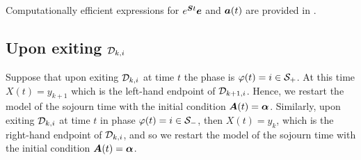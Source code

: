 Computationally efficient expressions for \(e^{\boldsymbol{S}t}\boldsymbol e\) and \(\boldsymbol a(t)\) are provided in \citep{hht2020}. 

\subsection{Upon exiting \(\mathcal{D}_{k,i}\)} Suppose that upon exiting \(\mathcal{D}_{k,i}\) at time \(t\) the phase is \(\varphi(t)=i\in\mathcal{S}_+\). At this time \(X(t)=y_{k+1}\) which is the left-hand endpoint of \(\mathcal{D}_{k+1,i}\). Hence, we restart the model of the sojourn time with the initial condition \(\boldsymbol A(t)=\boldsymbol \alpha\). Similarly, upon exiting \(\mathcal{D}_{k,i}\) at time \(t\) in phase \(\varphi(t)=i\in\mathcal{S}_-\), then \(X(t)=y_k\), which is the right-hand endpoint of \(\mathcal{D}_{k,i}\), and so we restart the model of the sojourn time with the initial condition \(\boldsymbol A(t)=\boldsymbol \alpha\).

